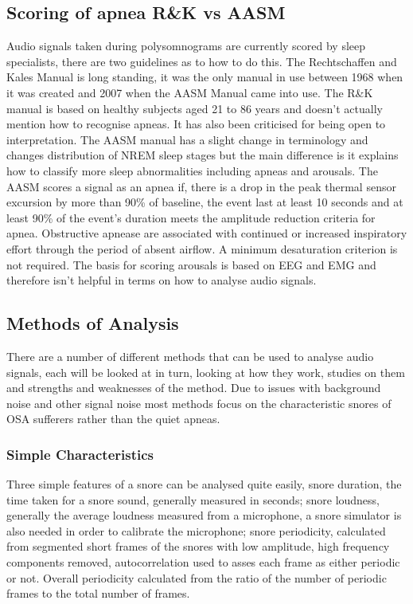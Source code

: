 \subsection{Scoring of apnea R\&K vs AASM}
Audio signals taken during polysomnograms are currently scored by sleep specialists, there are two guidelines as to how to do this. The Rechtschaffen and Kales Manual is long standing, it was the only manual in use between 1968 when it was created and 2007 when the AASM Manual came into use. 
The R\&K manual is based on healthy subjects aged 21 to 86 years and doesn’t actually mention how to recognise apneas. It has also been criticised for being open to interpretation. The AASM manual has a slight change in terminology and changes distribution of NREM sleep stages but the main difference is it explains how to classify more sleep abnormalities including apneas and arousals. 
The AASM scores a signal as an apnea if, there is a drop in the peak thermal sensor excursion by more than 90\% of baseline, the event last at least 10 seconds and at least 90\% of the event’s duration meets the amplitude reduction criteria for apnea. Obstructive apnease are associated with continued or increased inspiratory effort through the period of absent airflow. A minimum desaturation criterion is not required. 
The basis for scoring arousals is based on EEG and EMG and therefore isn’t helpful in terms on how to analyse audio signals. 

\subsection{Methods of Analysis}
There are a number of different methods that can be used to analyse audio signals, each will be looked at in turn, looking at how they work, studies on them and strengths and weaknesses of the method. Due to issues with background noise and other signal noise most methods focus on the characteristic snores of OSA sufferers rather than the quiet apneas. 

\subsubsection{Simple Characteristics}
Three simple features of a snore can be analysed quite easily, snore duration, the time taken for a snore sound, generally measured in seconds; snore loudness, generally the average loudness measured from a microphone, a snore simulator is also needed in order to calibrate the microphone; snore periodicity, calculated from segmented short frames of the snores with low amplitude, high frequency components removed, autocorrelation used to asses each frame as either periodic or not. Overall periodicity calculated from the ratio of the number of periodic frames to the total number of frames.

